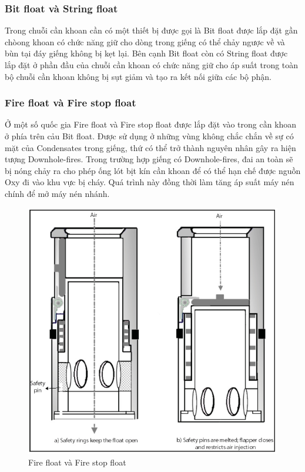 \documentclass[13pt,a4paper]{article}
\begin{document}
\subsubsection{Bit float và String float}
	Trong chuỗi cần khoan cần có một thiết bị được gọi là Bit float được lắp đặt gần chòong khoan có chức năng giữ cho dòng trong giếng có thể chảy ngược về và bùn tại đáy giếng không bị kẹt lại. Bên cạnh Bit float còn có String float được lắp đặt ở phần đầu của chuỗi cần khoan có chức năng giữ cho áp suất trong toàn bộ chuỗi cần khoan không bị sụt giảm và tạo ra kết nối giữa các bộ phận.
\subsubsection{Fire float và Fire stop float}
	Ở một số quốc gia Fire float và Fire stop float được lắp đặt vào trong cần khoan ở phía trên cảu Bit float. Được sử dụng ở những vùng không chắc chắn về sự có mặt của Condensates trong giếng, thứ có thể trở thành nguyên nhân gây ra hiện tượng Downhole-fires. Trong trường hợp giếng có Downhole-fires, đai an toàn sẽ bị nóng chảy ra cho phép ống lót bịt kín cần khoan để có thể hạn chế được nguồn Oxy đi vào khu vực bị cháy. Quá trình này đồng thời làm tăng áp suất máy nén chính để mở máy nén nhánh.
	\begin{figure}[h]
	\centering
	\includegraphics[scale=0.7]{Figs/Fig3.PNG}
	\caption{Fire float và Fire stop float}
	\end{figure}{}
\end{document}
